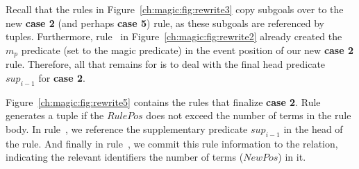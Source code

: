 Recall that the rules in Figure~\ref{ch:magic:fig:rewrite3} copy subgoals over
to the new {\bf case 2} (and perhaps {\bf case 5}) rule, as these subgoals are
referenced by  tuples.  Furthermore, rule~ in
Figure~\ref{ch:magic:fig:rewrite2} already created the $m_p$ predicate (set to
the magic predicate) in the event position of our new {\bf case 2} rule.
Therefore, all that remains for is to deal with the final head predicate
$sup_{i-1}$ for {\bf case 2}.

Figure~\ref{ch:magic:fig:rewrite5} contains the rules that finalize {\bf case
2}.  Rule~ generates a  tuple if the $RulePos$ does not
exceed the number of terms in the rule body.  In rule~, we reference
the supplementary predicate $sup_{i-1}$ in the head of the rule.  And finally
in rule~, we commit this rule information to the  relation,
indicating the relevant identifiers the number of terms ($NewPos$) in it.

